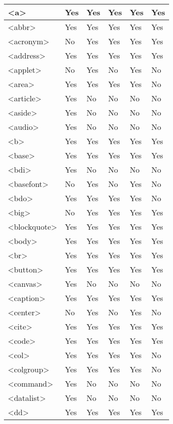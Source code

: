 \begin{longtable}{|l|l|l|l|l|l|}
\endlastfoot
\hline
<a>				&Yes	&Yes			&Yes	&Yes				&Yes	\\
\hline
<abbr>			&Yes	&Yes			&Yes	&Yes				&Yes	\\
\hline
<acronym>		&No		&Yes			&Yes	&Yes				&Yes	\\
\hline
<address>		&Yes	&Yes			&Yes	&Yes				&Yes	\\
\hline
<applet>			&No		&Yes			&No		&Yes				&No		\\
\hline
<area>			&Yes	&Yes			&Yes	&Yes				&No		\\
\hline
<article>			&Yes	&No				&No		&No					&No		\\
\hline
<aside>			&Yes	&No				&No		&No					&No		\\
\hline
<audio>			&Yes	&No				&No		&No					&No		\\
\hline
<b>				&Yes	&Yes			&Yes	&Yes				&Yes	\\
\hline
<base>			&Yes	&Yes			&Yes	&Yes				&Yes	\\
\hline
<bdi>			&Yes	&No				&No		&No					&No		\\
\hline
<basefont>		&No		&Yes			&No		&Yes				&No		\\
\hline
<bdo>			&Yes	&Yes			&Yes	&Yes				&No		\\
\hline
<big>			&No		&Yes			&Yes	&Yes				&Yes	\\
\hline
<blockquote>		&Yes	&Yes			&Yes	&Yes				&Yes	\\
\hline
<body>			&Yes	&Yes			&Yes	&Yes				&Yes	\\
\hline
<br>				&Yes	&Yes			&Yes	&Yes				&Yes	\\
\hline
<button>			&Yes	&Yes			&Yes	&Yes				&Yes	\\
\hline
<canvas>			&Yes	&No				&No		&No					&No		\\
\hline
<caption>			&Yes	&Yes			&Yes	&Yes				&Yes	\\
\hline
<center>			&No		&Yes			&No		&Yes				&No		\\
\hline
<cite>			&Yes	&Yes			&Yes	&Yes				&Yes	\\
\hline
<code>			&Yes	&Yes			&Yes	&Yes				&Yes	\\
\hline
<col>			&Yes	&Yes			&Yes	&Yes				&No		\\
\hline
<colgroup>		&Yes	&Yes			&Yes	&Yes				&No		\\
\hline
<command>		&Yes	&No				&No		&No					&No		\\
\hline
<datalist>		&Yes	&No				&No		&No					&No		\\
\hline
<dd>			&Yes	&Yes			&Yes	&Yes				&Yes	\\

\end{longtable}
